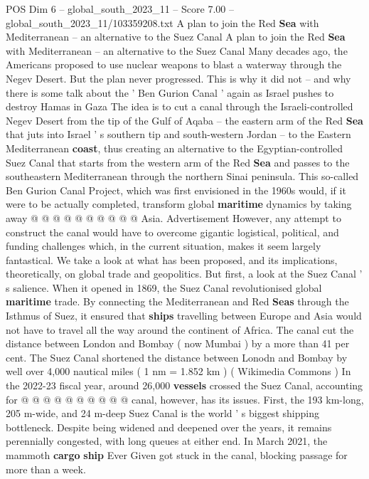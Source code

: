 \begin{textsample}{POS Dim 6 – global\_south\_2023\_11 – Score 7.00 – global\_south\_2023\_11/103359208.txt}  \label{ex:f6_pos_253}
A plan to join the Red \textbf{Sea} with Mediterranean -- an alternative to the Suez Canal A plan to join the Red \textbf{Sea} with Mediterranean -- an alternative to the Suez Canal Many decades ago, the Americans proposed to use nuclear weapons to blast a waterway through the Negev Desert.
But the plan never progressed.
This is why it did not -- and why there is some talk about the ' Ben Gurion Canal ' again as Israel pushes to destroy Hamas in Gaza The idea is to cut a canal through the Israeli-controlled Negev Desert from the tip of the Gulf of Aqaba -- the eastern arm of the Red \textbf{Sea} that juts into Israel ' s southern tip and south-western Jordan -- to the Eastern Mediterranean \textbf{coast}, thus creating an alternative to the Egyptian-controlled Suez Canal that starts from the western arm of the Red \textbf{Sea} and passes to the southeastern Mediterranean through the northern Sinai peninsula.
This so-called Ben Gurion Canal Project, which was first envisioned in the 1960s would, if it were to be actually completed, transform global \textbf{maritime} dynamics by taking away @ @ @ @ @ @ @ @ @ @ Asia.
Advertisement However, any attempt to construct the canal would have to overcome gigantic logistical, political, and funding challenges which, in the current situation, makes it seem largely fantastical.
We take a look at what has been proposed, and its implications, theoretically, on global trade and geopolitics.
But first, a look at the Suez Canal ' s salience.
When it opened in 1869, the Suez Canal revolutionised global \textbf{maritime} trade.
By connecting the Mediterranean and Red \textbf{Seas} through the Isthmus of Suez, it ensured that \textbf{ships} travelling between Europe and Asia would not have to travel all the way around the continent of Africa.
The canal cut the distance between London and Bombay ( now Mumbai ) by a more than 41 per cent.
The Suez Canal shortened the distance between Lonodn and Bombay by well over 4,000 nautical miles ( 1 nm = 1.852 km ) ( Wikimedia Commons ) In the 2022-23 fiscal year, around 26,000 \textbf{vessels} crossed the Suez Canal, accounting for @ @ @ @ @ @ @ @ @ @ canal, however, has its issues.
First, the 193 km-long, 205 m-wide, and 24 m-deep Suez Canal is the world ' s biggest shipping bottleneck.
Despite being widened and deepened over the years, it remains perennially congested, with long queues at either end.
In March 2021, the mammoth \textbf{cargo} \textbf{ship} Ever Given got stuck in the canal, blocking passage for more than a week.

\end{textsample}
